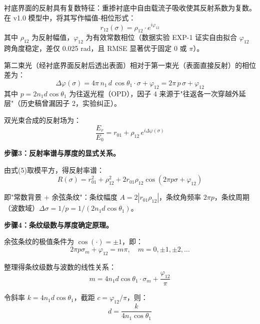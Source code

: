 衬底界面的反射具有复数特征：重掺衬底中自由载流子吸收使其反射系数为复数。在 v1.0 模型中，将其写作幅值-相位形式：
\begin{equation}
    r_{12}(\sigma) = \rho_{12} \cdot e^{i\varphi_{12}}
\end{equation}
其中 $\rho_{12}$ 为反射幅值，$\varphi_{12}$ 为有效常数相位（数据实验 EXP-1 证实自由拟合 $\varphi_{12}$ 跨角度稳定，差仅 0.025 rad，且 RMSE 显著优于固定 0 或 $\pi$）。

第二束光（经衬底界面反射后透出表面）相对于第一束光（表面直接反射）的相位差为：
\begin{equation}
    \Delta\varphi(\sigma) = 4\pi\,n_1\,d\,\cos\theta_1\cdot\sigma + \varphi_{12} = 2\pi\,p\,\sigma + \varphi_{12}
\end{equation}
其中 $p = 2n_1d\cos\theta_1$ 为往返光程（OPD），因子 4 来源于"往返各一次穿越外延层"（历史稿曾漏因子 2，实验纠正）。

双光束合成的反射场为：
\begin{equation}
    \frac{E_r}{E_0} = r_{01} + \rho_{12}\,e^{i\Delta\varphi(\sigma)}
\end{equation}

\textbf{步骤3：反射率谱与厚度的显式关系。}

由式(5)取模平方，得反射率谱：
\begin{equation}
    R(\sigma) = r_{01}^2 + \rho_{12}^2 + 2r_{01}\rho_{12}\cos(2\pi p\sigma + \varphi_{12})
\end{equation}

即"常数背景 $+$ 余弦条纹"：条纹幅度 $A=2|r_{01}\rho_{12}|$，条纹角频率 $2\pi p$，条纹周期（波数域）$\Delta\sigma = 1/p = 1/(2n_1d\cos\theta_1)$。

\textbf{步骤4：条纹级数与厚度确定原理。}

余弦条纹的极值条件为 $\cos(\cdot)=\pm1$，即：
\begin{equation}
    2\pi p\sigma_m + \varphi_{12} = m\pi, \quad m = 0, \pm1, \pm2, \ldots
\end{equation}

整理得条纹级数与波数的线性关系：
\begin{equation}
    m = 4n_1d\cos\theta_1\cdot\sigma_m + \frac{\varphi_{12}}{\pi}
\end{equation}

令斜率 $k = 4n_1d\cos\theta_1$，截距 $c = \varphi_{12}/\pi$，则：
\begin{equation}
    d = \frac{k}{4n_1\cos\theta_1}
\end{equation}

